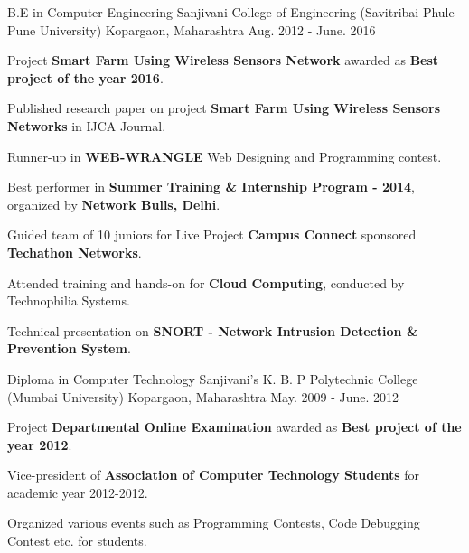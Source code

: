 

\begin{cventries}

  \cventry
    {B.E in Computer Engineering} %
    {Sanjivani College of Engineering (Savitribai Phule Pune University)} %
    {Kopargaon, Maharashtra} %
    {Aug. 2012 - June. 2016} %
    {
      \begin{cvitems} %
      	\item {Project \textbf{Smart Farm Using Wireless Sensors Network} awarded as \textbf{Best project of the year 2016}.}
        \item {Published research paper on project \textbf{Smart Farm Using Wireless Sensors Networks} in IJCA Journal.}  
        \item {Runner-up in \textbf{WEB-WRANGLE} Web Designing and Programming contest.}
        \item {Best performer in \textbf{Summer Training \& Internship Program - 2014}, organized by \textbf{Network Bulls, Delhi}.}
        \item {Guided team of 10 juniors for Live Project \textbf{Campus Connect} sponsored \textbf{Techathon Networks}.}
        \item {Attended training and hands-on for \textbf{Cloud Computing}, conducted by Technophilia Systems.}      
		\item {Technical presentation on \textbf{SNORT - Network Intrusion Detection \& Prevention System}.}         
      \end{cvitems}
    }
    \cventry
    {Diploma in Computer Technology} %
    {Sanjivani's K. B. P Polytechnic College (Mumbai University)} %
    {Kopargaon, Maharashtra} %
    {May. 2009 - June. 2012} %
    {
      \begin{cvitems} %
      	\item {Project \textbf{Departmental Online Examination} awarded as \textbf{Best project of the year 2012}.}
        \item {Vice-president of \textbf{Association of Computer Technology Students} for academic year 2012-2012.}
        \item{Organized various events such as Programming Contests, Code Debugging Contest etc. for students.}         
      \end{cvitems}
    }

\end{cventries}

